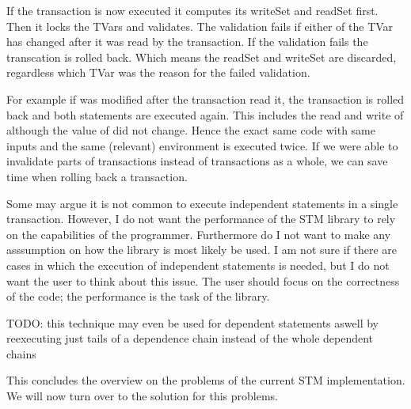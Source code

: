 If the transaction is now executed it computes its writeSet and readSet first. Then it locks the TVars and 
validates. The validation fails if either of the TVar has changed after it was read by the transaction.
If the validation fails the transcation is rolled back. Which means the readSet and writeSet are discarded,
regardless which TVar was the reason for the failed validation. 

For example if  was modified after the transaction read it, the transaction is rolled back and both 
statements are executed again. This includes the read and write of  although the value of 
 did not change. Hence the exact same code with same inputs and the same (relevant) environment is 
executed twice. If we were able to invalidate parts of transactions instead of transactions as a whole, 
we can save time when rolling back a transaction.  

Some may argue it is not common to execute independent statements in a single transaction. However, I do not want  
the performance of the STM library to rely on the capabilities of the programmer. 
Furthermore do I not want to make any asssumption on how the library is most likely be used. 
I am not sure if there
are cases in which the execution of independent statements is needed, but I do not want the user to think 
about this issue. The user should focus on the correctness of the code; the performance is the task of the
library. 

TODO: this technique may even be used for dependent statements aswell by reexecuting just tails of a dependence
chain instead of the whole dependent chains

This concludes the overview on the problems of the current STM implementation. We will now turn over to the 
solution for this problems.







% 
% 

